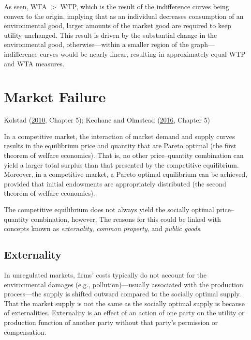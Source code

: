 \documentclass[
]{book}
\begin{document}
As seen, WTA \(>\) WTP, which is the result of the indifference curves being convex to the origin, implying that as an individual decreases consumption of an environmental good, larger amounts of the market good are required to keep utility unchanged. This result is driven by the substantial change in the environmental good, otherwise---within a smaller region of the graph---indifference curves would be nearly linear, resulting in approximately equal WTP and WTA measures.

\hypertarget{market-failure}{%
\chapter{Market Failure}\label{market-failure}}

Kolstad (\protect\hyperlink{ref-kolstad2010}{2010}, Chapter 5); Keohane and Olmstead (\protect\hyperlink{ref-keohane2016}{2016}, Chapter 5)

In a competitive market, the interaction of market demand and supply curves results in the equilibrium price and quantity that are Pareto optimal (the first theorem of welfare economics). That is, no other price--quantity combination can yield a larger total surplus than that presented by the competitive equilibrium. Moreover, in a competitive market, a Pareto optimal equilibrium can be achieved, provided that initial endowments are appropriately distributed (the second theorem of welfare economics).

The competitive equilibrium does not always yield the socially optimal price--quantity combination, however. The reasons for this could be linked with concepts known as \emph{externality}, \emph{common property}, and \emph{public goods}.

\hypertarget{externality}{%
\section{Externality}\label{externality}}

In unregulated markets, firms' costs typically do not account for the environmental damages (e.g., pollution)---usually associated with the production process---the supply is shifted outward compared to the socially optimal supply. That the market supply is not the same as the socially optimal supply is because of externalities. Externality is an effect of an action of one party on the utility or production function of another party without that party's permission or compensation.
\end{document}
